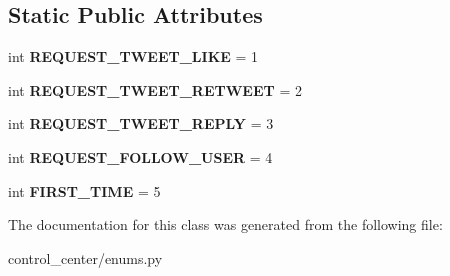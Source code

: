 \subsection*{Static Public Attributes}
\begin{DoxyCompactItemize}
\item 
\mbox{\label{classtwitter_1_1control__center_1_1enums_1_1PoliciesTypes_a26ce4fe53c91441a04f58fa33d923883}} 
int {\bfseries R\+E\+Q\+U\+E\+S\+T\+\_\+\+T\+W\+E\+E\+T\+\_\+\+L\+I\+KE} = 1
\item 
\mbox{\label{classtwitter_1_1control__center_1_1enums_1_1PoliciesTypes_a496393fa4829947c2576faad82518712}} 
int {\bfseries R\+E\+Q\+U\+E\+S\+T\+\_\+\+T\+W\+E\+E\+T\+\_\+\+R\+E\+T\+W\+E\+ET} = 2
\item 
\mbox{\label{classtwitter_1_1control__center_1_1enums_1_1PoliciesTypes_a3a5e4c87466c7021797f0b0bea368431}} 
int {\bfseries R\+E\+Q\+U\+E\+S\+T\+\_\+\+T\+W\+E\+E\+T\+\_\+\+R\+E\+P\+LY} = 3
\item 
\mbox{\label{classtwitter_1_1control__center_1_1enums_1_1PoliciesTypes_ad632b0f87c850d92691982ababaaaec8}} 
int {\bfseries R\+E\+Q\+U\+E\+S\+T\+\_\+\+F\+O\+L\+L\+O\+W\+\_\+\+U\+S\+ER} = 4
\item 
\mbox{\label{classtwitter_1_1control__center_1_1enums_1_1PoliciesTypes_a9adf39df52f67f73d6c25e4d28cbb0bb}} 
int {\bfseries F\+I\+R\+S\+T\+\_\+\+T\+I\+ME} = 5
\end{DoxyCompactItemize}


The documentation for this class was generated from the following file\+:\begin{DoxyCompactItemize}
\item 
control\+\_\+center/enums.\+py\end{DoxyCompactItemize}
